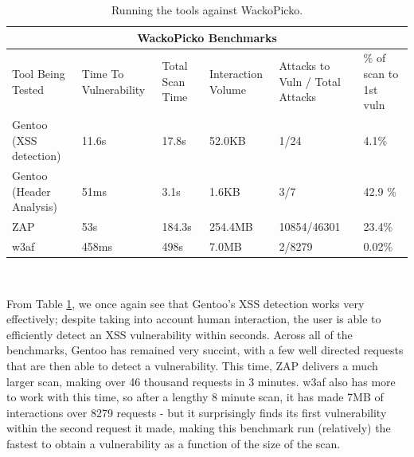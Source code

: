 \begin{table}[h]
	
	{
		\captionsetup{justification=centering}		
		\caption{Running the tools against WackoPicko.}
		\label{table:wackopicko_benchmarks}
		\begin{tabular}{ |p{4cm}||p{1.4cm}|p{1.4cm}|p{1.6cm}|p{2cm}|p{2cm}| }
			\hline
			\multicolumn{6}{|c|}{\textbf{WackoPicko Benchmarks}} \\ [0.5ex]
			\hline \hline 
			Tool Being Tested& Time To Vulnerability & Total Scan Time & Interaction Volume & Attacks to Vuln / Total Attacks & \% of scan to 1st vuln \\
			\hline
			Gentoo (XSS detection)    &   11.6s   &  17.8s   &  52.0KB           & 1/24 & 4.1\% \\
			Gentoo (Header Analysis) &  51ms &  3.1s  &  1.6KB  & 3/7 & 42.9 \%\\
			ZAP                                   & 53s &  184.3s   & 254.4MB & 10854/46301 & 23.4\%\\ 
			w3af                                 & 458ms & 498s & 7.0MB & 2/8279 & 0.02\% \\
			\hline
		\end{tabular}
	} \\
\end{table}

From Table \ref{table:wackopicko_benchmarks}, we once again see that Gentoo's XSS detection works very effectively; despite taking into account human interaction, the user is able to efficiently detect an XSS vulnerability within seconds. Across all of the benchmarks, Gentoo has remained very succint, with a few well directed requests that are then able to detect a vulnerability. This time, ZAP delivers a much larger scan, making over 46 thousand requests in 3 minutes. w3af also has more to work with this time, so after a lengthy 8 minute scan, it has made 7MB of interactions over 8279 requests - but it surprisingly finds its first vulnerability within the second request it made, making this benchmark run (relatively) the fastest to obtain a vulnerability as a function of the size of the scan. \\


